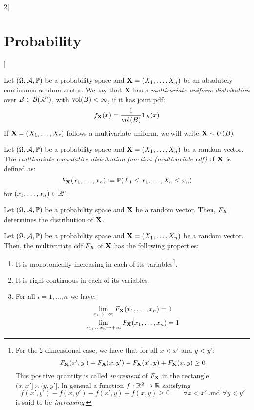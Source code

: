 \documentclass[../../../main.tex]{subfiles}
\begin{document}
\begin{multicols}{2}[\section{Probability}]
\begin{definition}
        Let $(\Omega,\mathcal{A},\mathbb{P})$ be a probability space and $\boldsymbol{\mathrm{X}}=(X_1,\ldots,X_n)$ be an absolutely continuous random vector. We say that $\boldsymbol{\mathrm{X}}$ has a \textit{multivariate uniform distribution} over $B\in\mathcal{B}(\mathbb{R}^n)$, with $\operatorname{vol}(B)<\infty$, if it has joint pdf: $$f_{\boldsymbol{\mathrm{X}}}(x)=\frac{1}{\operatorname{vol}(B)}\boldsymbol{\mathrm{1}}_B(x)$$ If $\boldsymbol{\mathrm{X}}=(X_1,\ldots,X_r)$ follows a multivariate uniform, we will write $\boldsymbol{\mathrm{X}}\sim U(B)$.
    \end{definition}
    \begin{definition}
        Let $(\Omega,\mathcal{A},\mathbb{P})$ be a probability space and $\boldsymbol{\mathrm{X}}=(X_1,\ldots,X_n)$ be a random vector. The \textit{multivariate cumulative distribution function (multivariate cdf)} of $\boldsymbol{\mathrm{X}}$ is defined as: $$F_{\boldsymbol{\mathrm{X}}}(x_1,\ldots,x_n):=\mathbb{P}(X_1\leq x_1,\ldots,X_n\leq x_n)$$ for $(x_1,\ldots,x_n)\in\mathbb{R}^n$.
    \end{definition}
    \begin{theorem}
        Let $(\Omega,\mathcal{A},\mathbb{P})$ be a probability space and $\boldsymbol{\mathrm{X}}$ be a random vector. Then, $F_{\boldsymbol{\mathrm{X}}}$ determines the distribution of $\boldsymbol{\mathrm{X}}$.
    \end{theorem}
    \begin{prop}
        Let $(\Omega,\mathcal{A},\mathbb{P})$ be a probability space and $\boldsymbol{\mathrm{X}}=(X_1,\ldots,X_n)$ be a random vector. Then, the multivariate cdf $F_{\boldsymbol{\mathrm{X}}}$ of $\boldsymbol{\mathrm{X}}$ has the following properties:
        \begin{enumerate}
            \item It is monotonically increasing in each of its variables\footnote{For the 2-dimensional case, we have that for all $x<x'$ and $y<y'$: $$F_{\boldsymbol{\mathrm{X}}}(x',y')-F_{\boldsymbol{\mathrm{X}}}(x,y')-F_{\boldsymbol{\mathrm{X}}}(x',y)+F_{\boldsymbol{\mathrm{X}}}(x,y)\geq 0$$ This positive quantity is called \textit{increment} of $F_{\boldsymbol{\mathrm{X}}}$ in the rectangle $(x,x']\times(y,y']$. In general a function $f:\mathbb{R}^2\rightarrow\mathbb{R}$ satisfying $$f(x',y')-f(x,y')-f(x',y)+f(x,y)\geq 0\qquad\forall x<x'\text{ and }\forall y<y'$$ is said to be \textit{increasing}.}.
            \item It is right-continuous in each of its variables.
            \item For all $i=1,\ldots,n$ we have:
                  \begin{gather*}
                      \lim_{x_i\to-\infty}F_{\boldsymbol{\mathrm{X}}}(x_1,\ldots,x_n)=0\\
                      \lim_{x_1,\ldots,x_n\to+\infty}F_{\boldsymbol{\mathrm{X}}}(x_1,\ldots,x_n)=1
                  \end{gather*}

\end{enumerate}
\end{prop}
\end{multicols}
\end{document}
